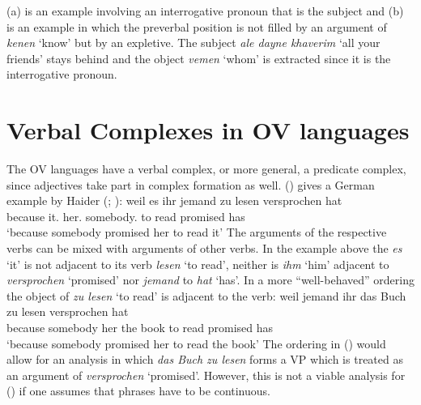 \eal
{}
\zl
(a) is an example involving an interrogative pronoun that is the subject and (b) is an
example in which the preverbal position is not filled by an argument of \emph{kenen} `know' but by
an expletive. The subject \emph{ale dayne khaverim} `all your friends' stays behind and the object
\emph{vemen} `whom' is extracted since it is the interrogative pronoun.



\section{Verbal Complexes in OV languages}


The OV languages have a verbal complex, or more general, a predicate complex, since adjectives take
part in complex formation as well. () gives a German example by Haider (\citeyear[]{Haider86c}; \citeyear[]{Haider90b}):
\ea
\gll weil es ihr jemand zu lesen versprochen hat\\
     because it.\ACC{} her.\DAT{} somebody.\NOM{} to read promised has\\\german
\glt `because somebody promised her to read it'
\z
The arguments of the respective verbs can be mixed with arguments of other verbs. In the example
above the \emph{es} `it' is not adjacent to its verb \emph{lesen} `to read', neither is \emph{ihm}
`him' adjacent to \emph{versprochen} `promised' nor \emph{jemand} to \emph{hat} `has'. In a more
``well-behaved'' ordering the object of \emph{zu lesen} `to read' is adjacent to the verb:
\ea
\gll weil    jemand   ihr das Buch zu lesen versprochen hat\\
     because somebody her the book to read  promised    has\\
\glt `because somebody promised her to read the book'
\z
The ordering in () would allow for an analysis in which \emph{das Buch zu lesen} forms a VP
which is treated as an argument of \emph{versprochen} `promised'. However, this is not a viable
analysis for () if one assumes that phrases have to be continuous.

